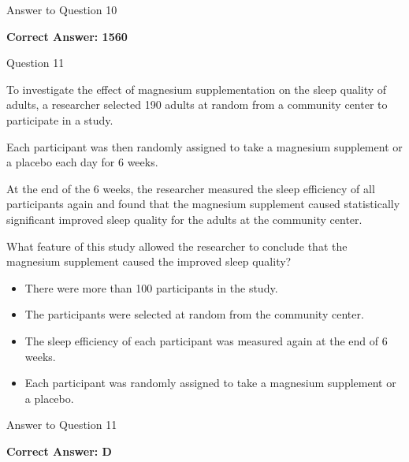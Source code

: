 \documentclass{beamer}
\begin{document}
\begin{frame}{Answer to Question 10}

\textbf{Correct Answer: 1560}

\end{frame}


\begin{frame}{Question 11}
\small

To investigate the effect of magnesium supplementation on the sleep quality of adults, a researcher selected 190 adults at random from a community center to participate in a study.

Each participant was then randomly assigned to take a magnesium supplement or a placebo each day for 6 weeks.

At the end of the 6 weeks, the researcher measured the sleep efficiency of all participants again and found that the magnesium supplement caused statistically significant improved sleep quality for the adults at the community center.

What feature of this study allowed the researcher to conclude that the magnesium supplement caused the improved sleep quality?





\begin{itemize}
    \item[A.] There were more than 100 participants in the study.
    \item[B.] The participants were selected at random from the community center.
    \item[C.] The sleep efficiency of each participant was measured again at the end of 6 weeks.
    \item[D.] Each participant was randomly assigned to take a magnesium supplement or a placebo.
\end{itemize}

\end{frame}

\begin{frame}{Answer to Question 11}

\textbf{Correct Answer: D}

\end{frame}

\end{document}
